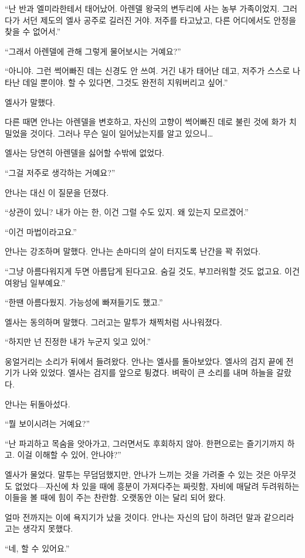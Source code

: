 ``난 반과 엘미라한테서 태어났어. 아렌델 왕국의 변두리에 사는 농부 가족이었지. 그러다가 서던 제도의 엘사 공주로 길러진 거야. 저주를 타고났고, 다른 어디에서도 안정을 찾을 수 없어서.''

``그래서 아렌델에 관해 그렇게 물어보시는 거예요?''

``아니야. 그런 썩어빠진 데는 신경도 안 쓰여. 거긴 내가 태어난 데고, 저주가 스스로 나타난 데일 뿐이야. 할 수 있다면, 그것도 완전히 지워버리고 싶어.''

엘사가 말했다.

다른 때면 안나는 아렌델을 변호하고, 자신의 고향이 썩어빠진 데로 불린 것에 화가 치밀었을 것이다. 그러나 무슨 일이 일어났는지를 알고 있으니\ldots

엘사는 당연히 아렌델을 싫어할 수밖에 없었다.

``그걸 저주로 생각하는 거예요?''

안나는 대신 이 질문을 던졌다.

``상관이 있니? 내가 아는 한, 이건 그럴 수도 있지. 왜 있는지 모르겠어.''

``이건 마법이라고요.''

안나는 강조하며 말했다. 안나는 손마디의 살이 터지도록 난간을 꽉 쥐었다.

``그냥 아름다워지게 두면 아름답게 된다고요. 숨길 것도, 부끄러워할 것도 없고요. 이건 여왕님 일부예요.''

``한땐 아름다웠지. 가능성에 빠져들기도 했고.''

엘사는 동의하며 말했다. 그러고는 말투가 채찍처럼 사나워졌다.

``하지만 넌 진정한 내가 누군지 잊고 있어.''

웅얼거리는 소리가 뒤에서 들려왔다. 안나는 엘사를 돌아보았다. 엘사의 검지 끝에 전기가 나와 있었다. 엘사는 검지를 앞으로 튕겼다. 벼락이 큰 소리를 내며 하늘을 갈랐다.

안나는 뒤돌아섰다.

``뭘 보이시려는 거예요?''

``난 파괴하고 목숨을 앗아가고, 그러면서도 후회하지 않아. 한편으로는 즐기기까지 하고. 이걸 이해할 수 있어, 안나야?''

엘사가 물었다. 말투는 무덤덤했지만, 안나가 느끼는 것을 가려줄 수 있는 것은 아무것도 없었다—자신에 차 있을 때에 흥분이 가져다주는 짜릿함, 자비에 매달려 두려워하는 이들을 볼 때에 힘이 주는 찬란함. 오랫동안 이는 달리 되어 왔다.

얼마 전까지는 이에 욕지기가 났을 것이다. 안나는 자신의 답이 하려던 말과 같으리라고는 생각지 못했다.

``네, 할 수 있어요.''

